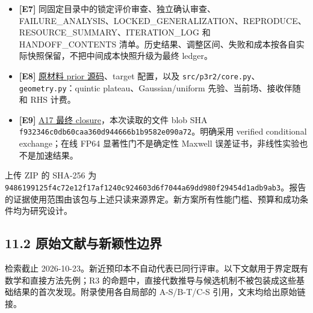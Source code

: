\documentclass[
  11pt,
  a4paper,
]{article}
\begin{document}
\begin{itemize}
\item
  \textbf{{[}E7{]}}
  同固定目录中的锁定评价审查、独立确认审查、FAILURE\_\allowbreak{}ANALYSIS、LOCKED\_\allowbreak{}GENERALIZATION、REPRODUCE、RESOURCE\_\allowbreak{}SUMMARY、ITERATION\_\allowbreak{}LOG
  和 HANDOFF\_\allowbreak{}CONTENTS
  清单。历史结果、调整区间、失败和成本按各自实际快照保留，不把中间成本快照升级为最终
  ledger。
\item
  \textbf{{[}E8{]}}
  \href{https://github.com/migodam/b1-probabilistic-maxwell-imaging/blob/6eadb4690c962aaa95821fc4056b677f0f924a6b/src/p1_material/prior.py}{原材料
  prior 源码}、target 配置，以及
  \nolinkurl{src/p3r2/core.py}、\nolinkurl{geometry.py}：quintic
  plateau、Gaussian/uniform 先验、当前场、接收伴随和 RHS 计费。
\item
  \textbf{{[}E9{]}}
  \href{https://github.com/migodam/a17-maxwell-certified-exchange/blob/main/closure_final/START_HERE.md}{A17
  最终 closure}，本次读取的文件 blob SHA
  \nolinkurl{f932346c0db60caa360d944666b1b9582e090a72}。明确采用 verified
  conditional exchange；在线 FP64 显著性门不是确定性 Maxwell
  误差证书，非线性实验也不是加速结果。
\end{itemize}

上传 ZIP 的 SHA-256 为
\nolinkurl{9486199125f4c72e12f17af1240c924603d6f7044a69dd980f29454d1adb9ab3}。报告的证据使用范围由该包与上述只读来源界定。新方案所有性能门槛、预算和成功条件均为研究设计。

\hypertarget{ux539fux59cbux6587ux732eux4e0eux65b0ux9896ux6027ux8fb9ux754c}{%
\subsection{11.2
原始文献与新颖性边界}\label{ux539fux59cbux6587ux732eux4e0eux65b0ux9896ux6027ux8fb9ux754c}}

检索截止
2026-10-23。新近预印本不自动代表已同行评审。以下文献用于界定既有数学和直接方法先例；R3
的命题中，直接代数推导与候选机制不被包装成这些基础结果的首次发现。附录使用各自局部的
A-S/B-T/C-S 引用，文末均给出原始链接。
\end{document}
